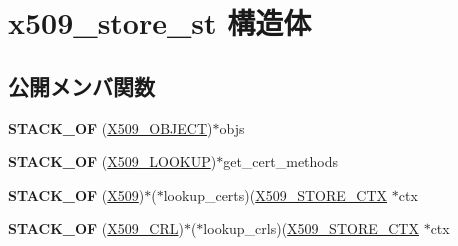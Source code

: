 \hypertarget{structx509__store__st}{}\section{x509\+\_\+store\+\_\+st 構造体}
\label{structx509__store__st}
\subsection*{公開メンバ関数}
\begin{DoxyCompactItemize}
\item 
\hypertarget{structx509__store__st_a1776bb2f46d4e05fb8fb6fcab0c20083}{}{\bfseries S\+T\+A\+C\+K\+\_\+\+O\+F} (\hyperlink{structx509__object__st}{X509\+\_\+\+O\+B\+J\+E\+C\+T})$\ast$objs\label{structx509__store__st_a1776bb2f46d4e05fb8fb6fcab0c20083}

\item 
\hypertarget{structx509__store__st_a7f1a555ef706f624180a55c3e87225db}{}{\bfseries S\+T\+A\+C\+K\+\_\+\+O\+F} (\hyperlink{structx509__lookup__st}{X509\+\_\+\+L\+O\+O\+K\+U\+P})$\ast$get\+\_\+cert\+\_\+methods\label{structx509__store__st_a7f1a555ef706f624180a55c3e87225db}

\item 
\hypertarget{structx509__store__st_aee14512a7342ddda8e21732da5bdb510}{}{\bfseries S\+T\+A\+C\+K\+\_\+\+O\+F} (\hyperlink{structx509__st}{X509})$\ast$($\ast$lookup\+\_\+certs)(\hyperlink{structx509__store__ctx__st}{X509\+\_\+\+S\+T\+O\+R\+E\+\_\+\+C\+T\+X} $\ast$ctx\label{structx509__store__st_aee14512a7342ddda8e21732da5bdb510}

\item 
\hypertarget{structx509__store__st_aeb4d9b3b06b5132d4c48bdb68f5da2b1}{}{\bfseries S\+T\+A\+C\+K\+\_\+\+O\+F} (\hyperlink{struct_x509__crl__st}{X509\+\_\+\+C\+R\+L})$\ast$($\ast$lookup\+\_\+crls)(\hyperlink{structx509__store__ctx__st}{X509\+\_\+\+S\+T\+O\+R\+E\+\_\+\+C\+T\+X} $\ast$ctx\label{structx509__store__st_aeb4d9b3b06b5132d4c48bdb68f5da2b1}

\end{DoxyCompactItemize}

